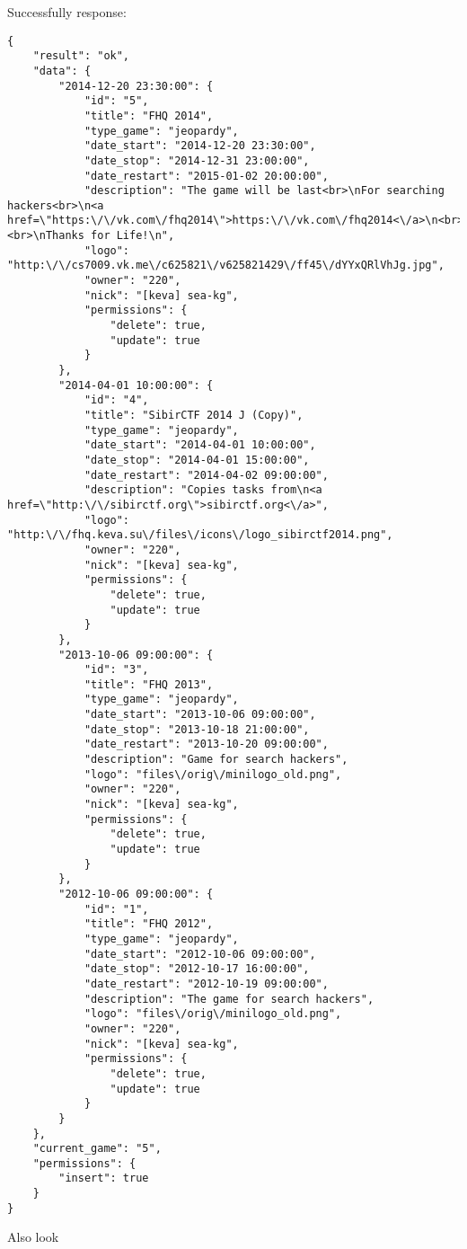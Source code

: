 Successfully response:  \\
\begin{Verbatim}[frame=single]
{
    "result": "ok",
    "data": {
        "2014-12-20 23:30:00": {
            "id": "5",
            "title": "FHQ 2014",
            "type_game": "jeopardy",
            "date_start": "2014-12-20 23:30:00",
            "date_stop": "2014-12-31 23:00:00",
            "date_restart": "2015-01-02 20:00:00",
            "description": "The game will be last<br>\nFor searching hackers<br>\n<a href=\"https:\/\/vk.com\/fhq2014\">https:\/\/vk.com\/fhq2014<\/a>\n<br><br>\nThanks for Life!\n",
            "logo": "http:\/\/cs7009.vk.me\/c625821\/v625821429\/ff45\/dYYxQRlVhJg.jpg",
            "owner": "220",
            "nick": "[keva] sea-kg",
            "permissions": {
                "delete": true,
                "update": true
            }
        },
        "2014-04-01 10:00:00": {
            "id": "4",
            "title": "SibirCTF 2014 J (Copy)",
            "type_game": "jeopardy",
            "date_start": "2014-04-01 10:00:00",
            "date_stop": "2014-04-01 15:00:00",
            "date_restart": "2014-04-02 09:00:00",
            "description": "Copies tasks from\n<a href=\"http:\/\/sibirctf.org\">sibirctf.org<\/a>",
            "logo": "http:\/\/fhq.keva.su\/files\/icons\/logo_sibirctf2014.png",
            "owner": "220",
            "nick": "[keva] sea-kg",
            "permissions": {
                "delete": true,
                "update": true
            }
        },
        "2013-10-06 09:00:00": {
            "id": "3",
            "title": "FHQ 2013",
            "type_game": "jeopardy",
            "date_start": "2013-10-06 09:00:00",
            "date_stop": "2013-10-18 21:00:00",
            "date_restart": "2013-10-20 09:00:00",
            "description": "Game for search hackers",
            "logo": "files\/orig\/minilogo_old.png",
            "owner": "220",
            "nick": "[keva] sea-kg",
            "permissions": {
                "delete": true,
                "update": true
            }
        },
        "2012-10-06 09:00:00": {
            "id": "1",
            "title": "FHQ 2012",
            "type_game": "jeopardy",
            "date_start": "2012-10-06 09:00:00",
            "date_stop": "2012-10-17 16:00:00",
            "date_restart": "2012-10-19 09:00:00",
            "description": "The game for search hackers",
            "logo": "files\/orig\/minilogo_old.png",
            "owner": "220",
            "nick": "[keva] sea-kg",
            "permissions": {
                "delete": true,
                "update": true
            }
        }
    },
    "current_game": "5",
    "permissions": {
        "insert": true
    }
}
\end{Verbatim}


Also look ~

